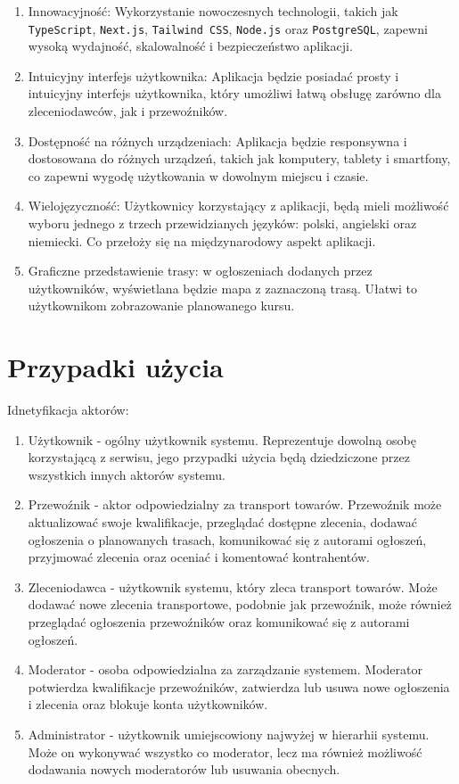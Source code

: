\begin{enumerate}
\item Innowacyjność: Wykorzystanie nowoczesnych technologii, takich jak \texttt{TypeScript}, \texttt{Next.js}, \texttt{Tailwind CSS}, \texttt{Node.js} oraz \texttt{PostgreSQL}, zapewni wysoką wydajność, skalowalność i bezpieczeństwo aplikacji.
\item Intuicyjny interfejs użytkownika: Aplikacja będzie posiadać prosty i intuicyjny interfejs użytkownika, który umożliwi łatwą obsługę zarówno dla zleceniodawców, jak i przewoźników.
\item Dostępność na różnych urządzeniach: Aplikacja będzie responsywna i dostosowana do różnych urządzeń, takich jak komputery, tablety i smartfony, co zapewni wygodę użytkowania w dowolnym miejscu i czasie.
\item Wielojęzyczność: Użytkownicy korzystający z aplikacji, będą mieli możliwość wyboru jednego z trzech przewidzianych języków: polski, angielski oraz niemiecki. Co przełoży się na międzynarodowy aspekt aplikacji.
\item Graficzne przedstawienie trasy: w ogłoszeniach dodanych przez użytkowników, wyświetlana będzie mapa z zaznaczoną trasą. Ułatwi to użytkownikom zobrazowanie planowanego kursu.
\end{enumerate}

\section{Przypadki użycia}
Idnetyfikacja aktorów:

\begin{enumerate}
\item Użytkownik - ogólny użytkownik systemu. Reprezentuje dowolną osobę korzystającą z serwisu, jego przypadki użycia będą dziedziczone przez wszystkich innych aktorów systemu.
\item Przewoźnik - aktor odpowiedzialny za transport towarów. Przewoźnik może aktualizować swoje kwalifikacje, przeglądać dostępne zlecenia, dodawać ogłoszenia o planowanych trasach, komunikować się z autorami ogłoszeń, przyjmować zlecenia oraz oceniać i komentować kontrahentów.
\item Zleceniodawca - użytkownik systemu, który zleca transport towarów. Może dodawać nowe zlecenia transportowe, podobnie jak przewoźnik, może również przeglądać ogłoszenia przewoźników oraz komunikować się z autorami ogłoszeń.
\item Moderator - osoba odpowiedzialna za zarządzanie systemem. Moderator potwierdza kwalifikacje przewoźników, zatwierdza lub usuwa nowe ogłoszenia i zlecenia oraz blokuje konta użytkowników.
\item Administrator - użytkownik umiejscowiony najwyżej w hierarhii systemu. Może on wykonywać wszystko co moderator, lecz ma również możliwość dodawania nowych moderatorów lub usuwania obecnych.
\end{enumerate}

